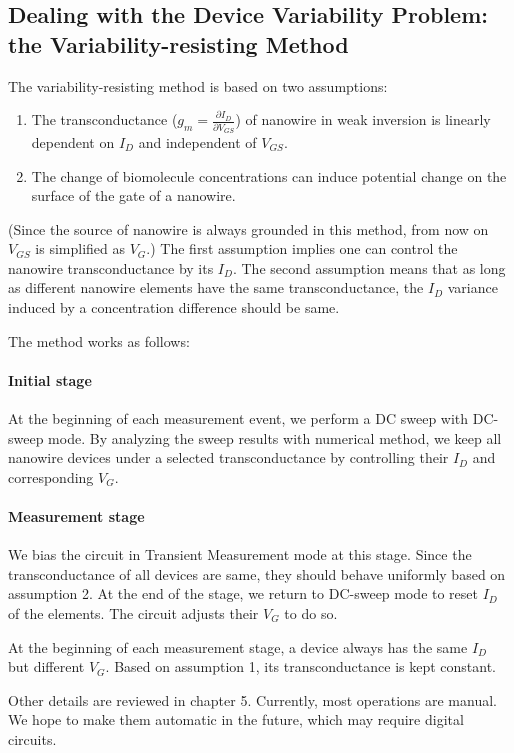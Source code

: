 \subsection*{Dealing with the Device Variability Problem: the Variability-resisting Method} \label{section:twqAssumption}
The variability-resisting method is based on two assumptions:
\begin{enumerate}
    \item The transconductance ($g_m = \frac{\partial I_D}{\partial V_{GS}}$) of nanowire in weak inversion is linearly dependent on $I_D$ and independent of $V_{GS}$.
    \item The change of biomolecule concentrations can induce potential change on the surface of the gate of a nanowire.
\end{enumerate}
(Since the source of nanowire is always grounded in this method, from now on $V_{GS}$ is simplified as $V_G$.)
The first assumption implies one can control the nanowire transconductance by its $I_D$.
The second assumption means that as long as different nanowire elements have the same transconductance, the $I_D$ variance induced by a concentration difference should be same.

The method works as follows:

\paragraph*{Initial stage}
At the beginning of each measurement event, we perform a DC sweep with DC-sweep mode.
By analyzing the sweep results with numerical method, we keep all nanowire devices under a selected transconductance by controlling their $I_D$ and corresponding $V_G$.


\paragraph*{Measurement stage}
We bias the circuit in Transient Measurement mode at this stage.
Since the transconductance of all devices are same, they should behave uniformly based on assumption 2.
At the end of the stage, we return to DC-sweep mode to reset $I_D$ of the elements.
The circuit adjusts their $V_G$ to do so.

At the beginning of each measurement stage, a device always has the same $I_D$ but different $V_G$.
Based on assumption 1, its transconductance is kept constant.

Other details are reviewed in chapter 5.
Currently, most operations are manual.
We hope to make them automatic in the future, which may require digital circuits.

